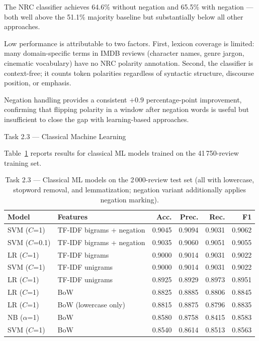 \documentclass[12pt,reqno,twoside]{amsbook}
\makeatletter
\def\section{\@startsection{section}{1}%
      \z@{.5\linespacing\@plus.7\linespacing}{.25\linespacing}%
      {\normalfont\bfseries\flushleft}}
\theoremstyle{plain}
\numberwithin{equation}{chapter}
\numberwithin{section}{chapter}
\makeatother
\begin{document}
\noindent The NRC classifier achieves 64.6\% without negation and 65.5\% with
negation --- both well above the 51.1\% majority baseline but substantially below
all other approaches.

Low performance is attributable to two factors.
First, lexicon coverage is limited: many domain-specific terms in IMDB reviews
(character names, genre jargon, cinematic vocabulary) have no NRC polarity
annotation.
Second, the classifier is context-free; it counts token polarities regardless of
syntactic structure, discourse position, or emphasis.

Negation handling provides a consistent $+0.9$ percentage-point improvement,
confirming that flipping polarity in a window after negation words is useful but
insufficient to close the gap with learning-based approaches.

\section{Task 2.3 --- Classical Machine Learning}

\noindent Table~\ref{tab:t23} reports results for classical ML models trained on
the 41\,750-review training set.

\begin{table}[ht]
\centering
\caption{Task 2.3 --- Classical ML models on the 2\,000-review test set
(all with lowercase, stopword removal, and lemmatization; negation variant
additionally applies negation marking).}
\label{tab:t23}
\setlength{\tabcolsep}{4pt}
\begin{tabular}{llrrrr}
\toprule
Model & Features & Acc. & Prec. & Rec. & F1 \\
\midrule
SVM ($C$=1)     & TF-IDF bigrams + negation & 0.9045 & 0.9094 & 0.9031 & 0.9062 \\
SVM ($C$=0.1)   & TF-IDF bigrams + negation & 0.9035 & 0.9060 & 0.9051 & 0.9055 \\
LR ($C$=1)      & TF-IDF bigrams            & 0.9000 & 0.9014 & 0.9031 & 0.9022 \\
SVM ($C$=1)     & TF-IDF unigrams           & 0.9000 & 0.9014 & 0.9031 & 0.9022 \\
LR ($C$=1)      & TF-IDF unigrams           & 0.8925 & 0.8929 & 0.8973 & 0.8951 \\
LR ($C$=1)      & BoW                       & 0.8825 & 0.8885 & 0.8806 & 0.8845 \\
LR ($C$=1)      & BoW (lowercase only)      & 0.8815 & 0.8875 & 0.8796 & 0.8835 \\
NB ($\alpha$=1) & BoW                       & 0.8580 & 0.8758 & 0.8415 & 0.8583 \\
SVM ($C$=1)     & BoW                       & 0.8540 & 0.8614 & 0.8513 & 0.8563 \\
\bottomrule
\end{tabular}
\end{table}
\end{document}
